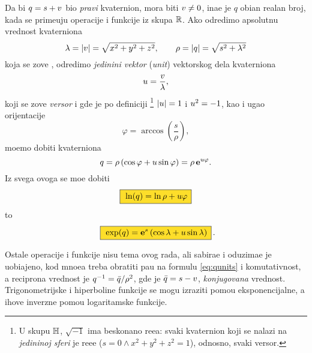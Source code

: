Da bi $q=s+{v}$ bio {\sl pravi\/} kvaternion, mora biti ${v}\ne0$, ina{\cv}e je $q$ obi{\cv}an realan broj, 
kada se prime{\nj}uju operacije i funkcije iz skupa ${\mathbb R}$.
Ako odredimo apsolutnu vrednost kvaterniona
$$
\lambda = {\vert{v}\vert} = \sqrt{\mathstrut x^2+y^2+z^2},\qquad
\rho = {\vert q\vert} = \sqrt{\mathstrut s^2+\lambda^2}
$$
koja se zove {\sl {}\/}, odredimo
{\sl jedini{\cv}ni vektor\/} ({\sl unit\/}) vektorskog dela kvaterniona
$$
{u} = \frac {{v}}\lambda, 
$$
koji se zove {\sl versor\/}
i gde je po definiciji%
\footnote{U skupu ${\mathbb H}$, $\sqrt{-1}$ ima beskona{\cv}no re{\sv}e{\nj}a:
svaki kvaternion koji se nalazi na {\sl jedini{\cv}noj sferi\/} je re{\sv}e{\nj}e
($s=0\land x^2+y^2+z^2=1$), odnosno, svaki versor.} 
${\vert{u}\vert}=1$ i  ${u}^2=-1$,
kao i ugao orijentacije
$$
\varphi = \arccos\left( \frac s\rho \right),
$$
mo{\zv}emo dobiti  kvaterniona
\begin{equation}
q
=\rho\,(\cos\varphi + {u}\sin\varphi)
=\rho\,{\bf e}^{{u}\varphi}.
\end{equation}
Iz svega ovoga se mo{\zv}e dobiti
\begin{equation}\index{ln@$\ln$}
    \okvir{\ln(q)  = \ln\rho + \uv\varphi}
\end{equation}
\hbox to \textwidth{\hss i\hss}
\begin{equation}\index{exp@$\exp$}
    \okvir{\exp(q) = \e^s \left( \cos\lambda + \uv\sin\lambda \right)}\rlap{.}
\end{equation}

\medskip

\danger
Ostale operacije i funkcije nisu tema ovog rada, ali sabira{\nj}e i oduzima{\nj}e
je uobi\-{\cv}a\-jeno, kod mno{\zv}e{\nj}a treba obratiti pa{\zv}{\nj}u na formulu \eqref{eq:qunits} i
komutativnost, a reci\-pro{\cv}na vrednost je
$q^{-1}={\bar q}/\rho^2$, gde je ${\bar q}=s-{v}$, {\sl konjugovana\/} vrednost. 
Tri\-gono\-metrijske i hiperboli{\cv}ne funkcije se mogu izraziti pomo{\cc}u eksponencijalne,
a {\nj}ihove inverzne pomo{\cc}u logaritamske funkcije.\par

